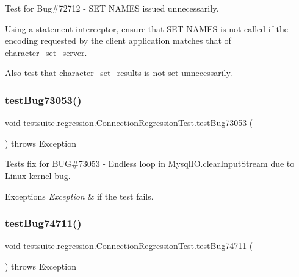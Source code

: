 Test for Bug\#72712 -\/ S\+ET N\+A\+M\+ES issued unnecessarily.

Using a statement interceptor, ensure that S\+ET N\+A\+M\+ES is not called if the encoding requested by the client application matches that of character\+\_\+set\+\_\+server.

Also test that character\+\_\+set\+\_\+results is not set unnecessarily. \mbox{\label{classtestsuite_1_1regression_1_1_connection_regression_test_a264deb8ed8bb847ac786dbb4fd6ebb19}} 
\subsubsection{\texorpdfstring{test\+Bug73053()}{testBug73053()}}
{\footnotesize\ttfamily void testsuite.\+regression.\+Connection\+Regression\+Test.\+test\+Bug73053 (\begin{DoxyParamCaption}{ }\end{DoxyParamCaption}) throws Exception}

Tests fix for B\+UG\#73053 -\/ Endless loop in Mysql\+I\+O.\+clear\+Input\+Stream due to Linux kernel bug.


\begin{DoxyExceptions}{Exceptions}
{\em Exception} & if the test fails. \\
\hline
\end{DoxyExceptions}
\mbox{\label{classtestsuite_1_1regression_1_1_connection_regression_test_a9c03aad693cf9263c8523b7d3c65f223}} 
\subsubsection{\texorpdfstring{test\+Bug74711()}{testBug74711()}}
{\footnotesize\ttfamily void testsuite.\+regression.\+Connection\+Regression\+Test.\+test\+Bug74711 (\begin{DoxyParamCaption}{ }\end{DoxyParamCaption}) throws Exception}


